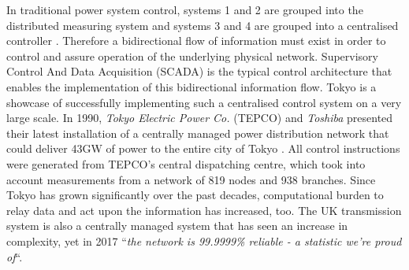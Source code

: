 
In traditional power system control, systems 1 and 2 are grouped into the distributed measuring system and systems 3 and 4 are grouped into a centralised controller \cite{Nelson1985}.
Therefore a bidirectional flow of information must exist in order to control and assure operation of the underlying physical network.
Supervisory Control And Data Acquisition (SCADA) is the typical control architecture that enables the implementation of this bidirectional information flow.
Tokyo is a showcase of successfully implementing such a centralised control system on a very large scale.
In 1990, \textit{Tokyo Electric Power Co.} (TEPCO) and \textit{Toshiba} presented their latest installation of a centrally managed power distribution network that could deliver 43GW of power to the entire city of Tokyo \cite{Matsuzawa1990}.
All control instructions were generated from TEPCO's central dispatching centre, which took into account measurements from a network of 819 nodes and 938 branches.
Since Tokyo has grown significantly over the past decades, computational burden to relay data and act upon the information has increased, too.
The UK transmission system is also a centrally managed system that has seen an increase in complexity, yet in 2017 ``\textit{the network is 99.9999\% reliable - a statistic we're proud of}``\cite{NationalGrid2017}.



